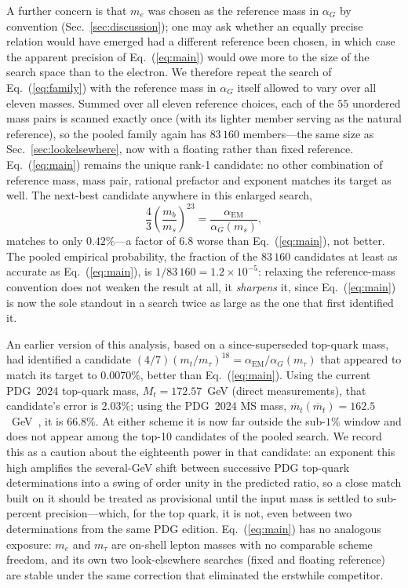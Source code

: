 \documentclass[aps,prd,preprint,amsmath,amssymb,nofootinbib]{revtex4-2}
\begin{document}
A further concern is that $m_e$ was chosen as the reference mass in
$\alpha_G$ by convention (Sec.~\ref{sec:discussion}); one may ask whether an
equally precise relation would have emerged had a different reference been
chosen, in which case the apparent precision of Eq.~(\ref{eq:main}) would owe
more to the size of the search space than to the electron. We therefore
repeat the search of Eq.~(\ref{eq:family}) with the reference mass in
$\alpha_G$ itself allowed to vary over all eleven masses. Summed over all
eleven reference choices, each of the $55$ unordered mass pairs is scanned
exactly once (with its lighter member serving as the natural reference), so
the pooled family again has $83\,160$ members---the same size as
Sec.~\ref{sec:lookelsewhere}, now with a floating rather than fixed
reference. Eq.~(\ref{eq:main}) remains the unique rank-1 candidate: no other
combination of reference mass, mass pair, rational prefactor and exponent
matches its target as well. The next-best candidate anywhere in this enlarged
search,
\begin{equation}
\frac{4}{3}\left(\frac{m_b}{m_s}\right)^{\!23}
= \frac{\alpha_{\mathrm{EM}}}{\alpha_G(m_s)},
\end{equation}
matches to only $0.42\%$---a factor of $6.8$ worse than Eq.~(\ref{eq:main}),
not better. The pooled empirical probability, the fraction of the $83\,160$
candidates at least as accurate as Eq.~(\ref{eq:main}), is $1/83\,160
=1.2\times 10^{-5}$: relaxing the reference-mass convention does not weaken
the result at all, it \emph{sharpens} it, since Eq.~(\ref{eq:main}) is now the
sole standout in a search twice as large as the one that first identified it.

An earlier version of this analysis, based on a since-superseded top-quark
mass, had identified a candidate
$(4/7)(m_t/m_\tau)^{18}=\alpha_{\mathrm{EM}}/\alpha_G(m_\tau)$ that appeared to
match its target to $0.0070\%$, better than Eq.~(\ref{eq:main}). Using the
current PDG~2024 top-quark mass, $M_t=172.57$~GeV (direct measurements), that
candidate's error is $2.03\%$; using the PDG~2024 $\overline{\mathrm{MS}}$
mass, $\overline{m}_t(\overline{m}_t)=162.5$~GeV~\cite{pdg2024}, it is
$66.8\%$. At either scheme it is now far outside the sub-$1\%$ window and does
not appear among the top-10 candidates of the pooled search. We record this
as a caution about the eighteenth power in that candidate: an exponent this
high amplifies the several-GeV shift between successive PDG top-quark
determinations into a swing of order unity in the predicted ratio, so a
close match built on it should be treated as provisional until the input mass
is settled to sub-percent precision---which, for the top quark, it is not,
even between two determinations from the same PDG edition. Eq.~(\ref{eq:main})
has no analogous exposure: $m_e$ and $m_\tau$ are on-shell lepton masses with
no comparable scheme freedom, and its own two look-elsewhere searches (fixed
and floating reference) are stable under the same correction that eliminated
the erstwhile competitor.
\end{document}
